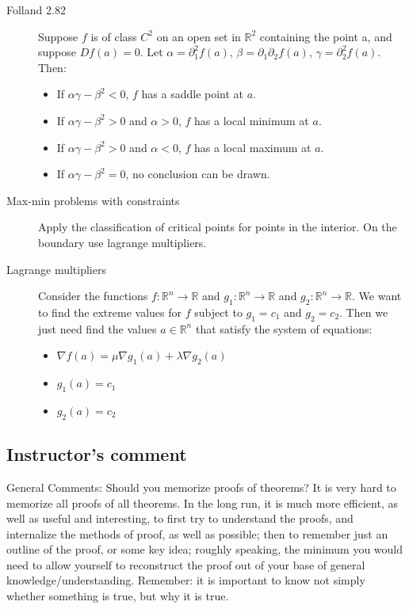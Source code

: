 \begin{description}
\item[Folland 2.82] Suppose $f$ is of class $C^2$ on an open set in $\mathbb{R}^2$ containing the point a, and suppose $Df(a) = 0$. Let $\alpha = \partial_1^2 f(a)$, $\beta = \partial_1\partial_2 f(a)$, $\gamma = \partial_2^2 f(a)$. Then:
	\begin{itemize}
		\item If $\alpha\gamma - \beta^2 < 0$, $f$ has a saddle point at $a$.
		\item If $\alpha\gamma - \beta^2 > 0$ and $\alpha > 0$, $f$ has a local minimum at $a$.
		\item If $\alpha\gamma - \beta^2 > 0$ and $\alpha < 0$, $f$ has a local maximum at $a$.
		\item If $\alpha\gamma - \beta^2 = 0$, no conclusion can be drawn.
	\end{itemize}
\item[Max-min problems with constraints]
Apply the classification of critical points for points in the interior. On the boundary use lagrange multipliers.
\item[Lagrange multipliers]
Consider the functions $f: \mathbb{R}^n \to \mathbb{R}$ and $g_1: \mathbb{R}^n \to \mathbb{R}$ and $g_2: \mathbb{R}^n \to \mathbb{R}$. We want to find the extreme values for $f$ subject to $g_1 = c_1$ and $g_2 = c_2$. Then we just need find the values $a \in \mathbb{R}^n$ that satisfy the system of equations:
	\begin{itemize}
		\item $\nabla f(a) = \mu \nabla g_1(a) + \lambda \nabla g_2(a)$
		\item $g_1(a) = c_1$
		\item $g_2(a) = c_2$
	\end{itemize}
\end{description}



\subsection{Instructor's comment}
General Comments: Should you memorize proofs of theorems? It is very hard to
memorize all proofs of all theorems. In the long run, it is much more efficient, as well
as useful and interesting, to first try to understand the proofs, and internalize the
methods of proof, as well as possible; then to remember just an outline of the proof,
or some key idea; roughly speaking, the minimum you would need to allow yourself
to reconstruct the proof out of your base of general knowledge/understanding.
Remember: it is important to know not simply whether something is true, but why
it is true.



